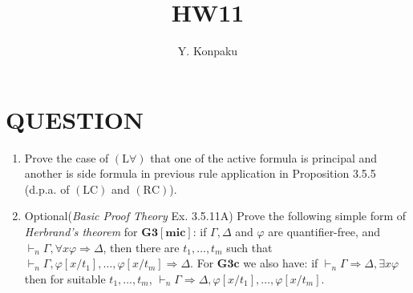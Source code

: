 \documentclass[12pt]{article}
\newcommand\A{\varphi}
\newcommand\GG\Gamma
\newcommand\D\Delta
\newcommand\TO\Rightarrow
\newcommand\PC[1]{\mathbf{#1}}
\newcommand\LC{\textrm{LC}}
\newcommand\RC{\textrm{RC}}
\newcommand\LU{\textrm{L$\forall$}}
\begin{document}
\title{HW11}
\author{Y. Konpaku}

\maketitle

\section{QUESTION}
\begin{enumerate}
    \item Prove the case of $(\LU)$ that one of the active formula is principal and another is side formula in previous rule application in Proposition 3.5.5 (d.p.a. of $(\LC)$ and $(\RC)$).
    \item \lbrack Optional\rbrack (\emph{Basic Proof Theory} Ex. 3.5.11A) Prove the following simple form of \emph{Herbrand's theorem} for $\PC{G3[mic]}$: if $\GG,\D$ and $\A$ are quantifier-free, and $\vdash_n\GG,\forall x\A\TO\D$, then there are $t_1,\ldots,t_m$ such that $\vdash_n\GG,\A[x/t_1],\ldots,\A[x/t_m]\TO\D$. For $\PC{G3c}$ we also have: if $\vdash_n\GG\TO\D,\exists x\A$ then for suitable $t_1,\ldots,t_m$, $\vdash_n\GG\TO\D,\A[x/t_1],\ldots,\A[x/t_m]$.
\end{enumerate}
\end{document}
